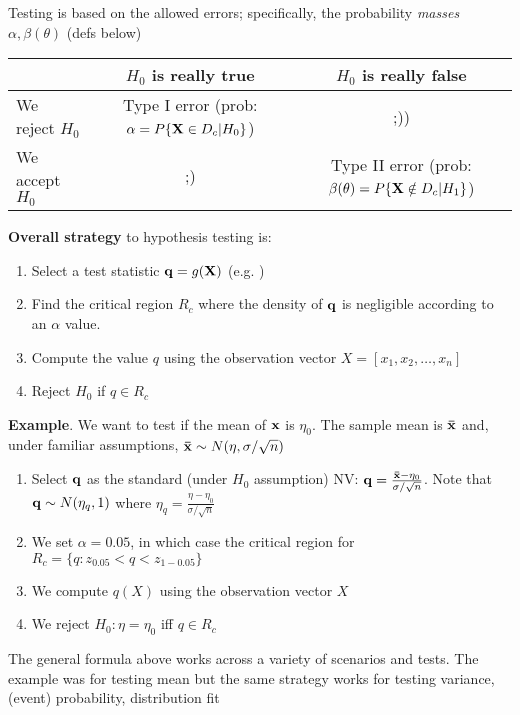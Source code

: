 \documentclass[a4paper]{book}
\begin{document}
Testing is based on the allowed errors; specifically, the probability \textit{masses} $\alpha, \beta(\theta)$ (defs below) 
\begin{table}[h!]
\centering
\begin{tabular}{|l | c | c|} \hline
				& $H_0$ is really true 			& $H_0$ is really false \\ \hline	
We reject $H_0$	& Type I error (prob: $\alpha = P\{ \mathbf{X} \in D_c | H_0 \}$) & ;)) \\\hline
We accept $H_0$	& ;) & Type II error (prob: $\beta(\theta) = P\{ \mathbf{X} \notin D_c | H_1 \}$)  \\\hline
\end{tabular} 
\end{table}

\noindent \textbf{Overall strategy} to hypothesis testing is: 
\begin{enumerate}
\setlength\itemsep{0.05em}
\item Select a test statistic $\mathbf{q} = g(\mathbf{X})$ (e.g. )
\item Find the critical region $R_c$ where the density of $\mathbf{q}$ is negligible according to an $\alpha$ value.
\item Compute the value $q$ using the observation vector $X=[x_1,x_2,\hdots,x_n]$
\item Reject $H_0$ if $q \in R_c$ 
\end{enumerate}

\noindent \textbf{Example}. We want to test if the mean of $\mathbf{x}$ is $\eta_0$. The sample mean is $\mathbf{\bar{x}}$ and, under familiar assumptions, $\mathbf{\bar{x}}\sim N(\eta, \sigma/\sqrt{n})$
\begin{enumerate}
\setlength\itemsep{0.05em}
\item Select $\mathbf{q}$ as the standard (under $H_0$ assumption) NV: $\mathbf{q}=\frac{\mathbf{\bar{x}}-\eta_0}{\sigma/\sqrt{n}}$. Note that $\mathbf{q}\sim N(\eta_q, 1)$ where $\eta_q=\frac{\eta-\eta_0}{\sigma/\sqrt{n}}$
\item We set $\alpha=0.05$, in which case the critical region for $R_c = \{q : z_{0.05} < q < z_{1-0.05}\}$
\item We compute $q(X)$ using the observation vector $X$
\item We reject $H_0:\eta=\eta_0$ iff $q\in R_c$
\end{enumerate}

\noindent The general formula above works across a variety of scenarios and tests. The example was for testing mean but the same strategy works for testing variance, (event) probability, distribution fit
\end{document}
